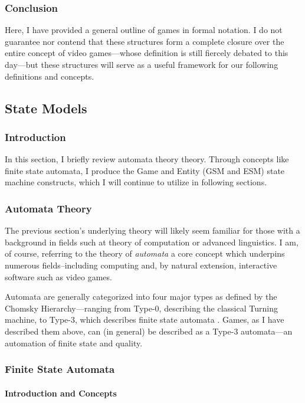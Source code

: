 \documentclass{report}
\begin{document}
\subsubsection{Conclusion}
Here, I have provided a general outline of games in formal notation. I do not guarantee nor contend that these structures form a complete closure over the entire concept of video games---whose definition is still fiercely debated to this day\cite{Knoop_2021}---but these structures will serve as a useful framework for our following definitions and concepts.

\subsection{State Models}

\subsubsection{Introduction} 
In this section, I briefly review automata theory theory. Through concepts like finite state automata, I produce the Game and Entity (GSM and ESM) state machine constructs, which I will continue to utilize in following sections.

\subsubsection{Automata Theory}
The previous section's underlying theory will likely seem familiar for those with a background in fields such at theory of computation or advanced linguistics. I am, of course, referring to the theory of \emph{automata} a core concept which underpins numerous fields--including computing and, by natural extension, interactive software such as video games. 

Automata are generally categorized into four major types as defined by the Chomsky Hierarchy---ranging from Type-0, describing the classical Turning machine, to Type-3, which describes finite state automata \cite{Chomsky1956ThreeMF}. Games, as I have described them above, can (in general) be described as a Type-3 automata---an automation of finite state and quality. 

\subsubsection{Finite State Automata}

\paragraph{Introduction and Concepts}
\end{document}
